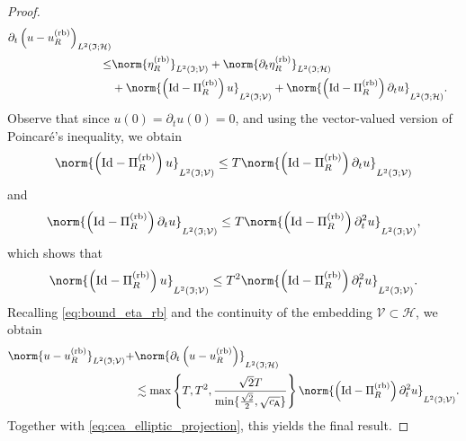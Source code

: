 \begin{proof}
\begin{equation}
\begin{aligned}
{		\partial_t 
		\left(u
		-
		 u^{\normalfont\text{(rb)}}_R
		 \right)
	}_{L^2(\mathfrak{I};\mathcal{H})}
	\\
    \leq
    &
	\norm{
		\eta^{\text{(rb)}}_R
	}_{L^2(\mathfrak{I};\mathcal{V})}
    +
    \norm{	
        \partial_t
        \eta^{\text{(rb)}}_R
    }_{L^2(\mathfrak{I};\mathcal{H})}
    \\
    &
    +
    \norm{
        \left(
            \text{Id}
            -
             \Pi^{\text{(rb)}}_R
        \right)  u
    }_{L^2(\mathfrak{I};\mathcal{V})}
    +
    \norm{
        \left(
            \text{Id}
            -
             \Pi^{\text{(rb)}}_R
        \right)  \partial_t u
    }_{L^2(\mathfrak{I};\mathcal{H})}.
\end{aligned}
\end{equation}
Observe that since $u(0) = \partial_t u(0) = 0$, and using the vector-valued version of
Poincaré's inequality, we obtain
\begin{equation}
    \norm{
    \left(
        \text{Id}
        -
         \Pi^{\text{(rb)}}_R
    \right)
    u}_{L^2(\mathfrak{I};\mathcal{V})}
    \leq
    T
    \norm{
    \left(
        \text{Id}
        -
        \Pi^{\text{(rb)}}_R
    \right)
    \partial_t u}_{L^2(\mathfrak{I};\mathcal{V})}
\end{equation}
and
\begin{equation}
    \norm{
        \left(
            \text{Id}
            -
             \Pi^{\text{(rb)}}_R
        \right)
        \partial_t u
    }_{L^2(\mathfrak{I};\mathcal{V})}
    \leq
    T
    \norm{
    \left(
        \text{Id}
        -
         \Pi^{\text{(rb)}}_R
    \right)
    \partial^2_t u}_{L^2(\mathfrak{I};\mathcal{V})},
\end{equation}
which shows that
\begin{equation}
    \norm{
        \left(
            \text{Id}
            -
            \Pi^{\text{(rb)}}_R
        \right)
        u
    }_{L^2(\mathfrak{I};\mathcal{V})}
    \leq
    T^2
    \norm{
    \left(
        \text{Id}
        -
         \Pi^{\text{(rb)}}_R
    \right)
    \partial^2_t u}_{L^2(\mathfrak{I};\mathcal{V})}.
\end{equation}
Recalling \eqref{eq:bound_eta_rb} and the continuity of the embedding
$\mathcal{V} \subset \mathcal{H}$, we obtain
\begin{equation}
\begin{aligned}
	\norm{
		u
		-
		u^{\normalfont\text{(rb)}}_R
	}_{L^2(\mathfrak{I};\mathcal{V})}
    +
    &
	\norm{
		\partial_t 
		\left(u
		-
		 u^{\normalfont\text{(rb)}}_R
		 \right)
	}_{L^2(\mathfrak{I};\mathcal{H})}
	\\
	&
    \lesssim
    \max
    \left\{
        T,T^2,\frac{\sqrt{2}T}{\min\{\frac{\sqrt{2}}{2} ,\sqrt{ c_{\mathsf{A}}}\}}
    \right\}
    \norm{
        \left(
            \text{Id}
            -
        		\Pi^{\text{(rb)}}_R
        \right) \partial^2_t u
    }_{L^2(\mathfrak{I};\mathcal{V})}.
\end{aligned}
\end{equation}
Together with \eqref{eq:cea_elliptic_projection}, this yields the final result. 
\end{proof}

